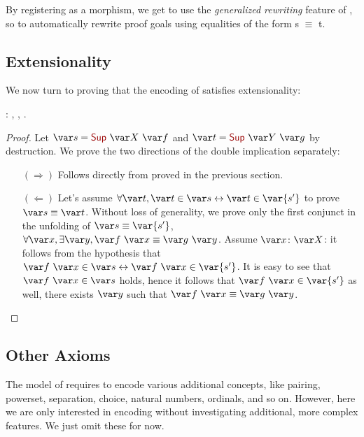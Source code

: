 By registering  as a morphism, we get to use the \emph{generalized rewriting} feature of \Coq{}, so to automatically rewrite proof goals using equalities of the form \var s $\equiv$ \var t.

\subsection{Extensionality}
We now turn to proving that the encoding of \ZF{} satisfies extensionality:

\begin{coqdoccode}
  \coqdocemptyline
  \coqdocnoindent
   : \coqdockw{\ensuremath{\forall}}  ,     \coqdockw{\ensuremath{\forall}} ,       .\coqdoceol
\end{coqdoccode}
\begin{proof}
  Let $\var s = \coqdocconstructor{Sup}~\var X~\var f$ and $\var t = \coqdocconstructor{Sup}~\var Y~\var g$ by destruction.
  We prove the two directions of the double implication separately:
  \begin{itemize}
    \item[$(\Rightarrow)$] Follows directly from  proved in the previous section.

    \item[$(\Leftarrow)$] Let's assume $\forall \var t, \var t\in \var s \leftrightarrow \var t \in \var{s'}$ to prove $\var s \equiv \var t$. Without loss of generality, we prove only the first conjunct in the unfolding of $\var s \equiv \var {s'}$, \ie{} $\forall \var x, \exists \var y, \var f~\var x \equiv \var g~\var y$. Assume $\var x\colon \var X$: it follows from the hypothesis that $\var f~\var x\in \var s \leftrightarrow \var f~\var x \in \var{s'}$. It is easy to see that $\var f~\var x\in \var s$ holds, hence it follows that $\var f~\var x \in \var{s'}$ as well, \ie{} there exists $\var y$ such that $\var f~\var x \equiv \var g~\var y$.
    \qedhere
  \end{itemize}
\end{proof}

\subsection{Other \ZF{} Axioms}
The model of \ZFC{} requires to encode various additional concepts, like pairing, powerset, separation, choice, natural numbers, ordinals, and so on. However, here we are only interested in encoding \NFX{} without investigating additional, more complex features. We just omit these for now.
